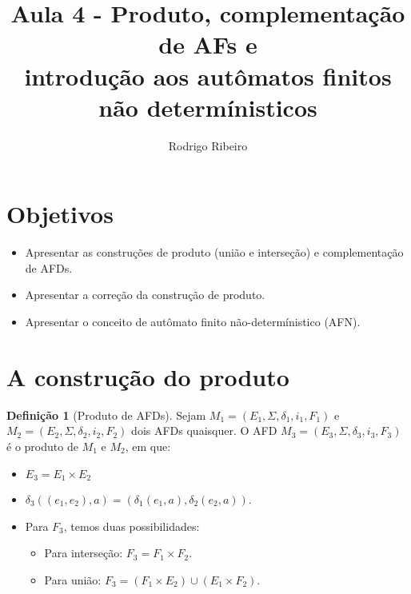 \documentclass[a4paper]{article}
\theoremstyle{definition}
\newtheorem{Definition}{Definição}
\begin{document}
  \title{Aula 4 - Produto, complementação de AFs e\\ introdução aos autômatos
    finitos não determínisticos}
  \author{Rodrigo Ribeiro}

  \maketitle


  \pagestyle{fancy}


  \section*{Objetivos}

  \begin{itemize}
     \item Apresentar as construções de produto (união e interseção) e
       complementação de AFDs. 
     \item Apresentar a correção da construção de produto.
     \item Apresentar o conceito de autômato finito não-determínistico (AFN).
  \end{itemize}

  \section{A construção do produto}

  \begin{Definition}[Produto de AFDs]
    Sejam $M_1 = (E_1,\Sigma,\delta_1,i_1,F_1)$ e $M_2 =
    (E_2,\Sigma,\delta_2,i_2,F_2)$ dois AFDs quaisquer. O AFD
    $M_3=(E_3,\Sigma,\delta_3,i_3,F_3)$ é o produto de $M_1$ e
    $M_2$, em que:
    \begin{itemize}
       \item $E_3 = E_1 \times E_2$
       \item $\delta_3((e_1,e_2),a) = (\delta_1(e_1,a),\delta_2(e_2,a))$.
       \item Para $F_3$, temos duas possibilidades:
         \begin{itemize}
           \item Para interseção: $F_3 = F_1 \times F_2$.
           \item Para união: $F_3 = (F_1 \times E_2) \cup (E_1 \times F_2)$.
         \end{itemize}
    \end{itemize}
  \end{Definition}
\end{document}
